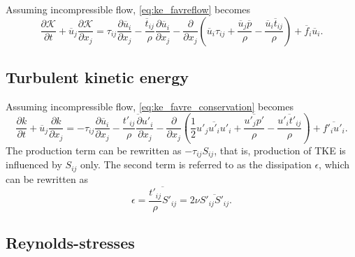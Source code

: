 \documentclass[oneside,a4paper,11pt]{report}
\newcommand{\favg}{\overline{f}}
\newcommand{\pavg}{\overline{p}}
\newcommand{\tavg}{\overline{t}}
\newcommand{\uavg}{\overline{u}}
\newcommand{\ffluc}{f'}
\newcommand{\pfluc}{p'}
\newcommand{\tfluc}{t'}
\newcommand{\ufluc}{u'}
\newcommand{\Sfluc}{S'}
\newcommand{\rs}{\tau}          %
\begin{document}
Assuming incompressible flow, \cref{eq:ke_favreflow} becomes
\begin{equation}
\label{eq:ke_ransflow}
\frac{\partial \mathcal{K} }{\partial t} + \uavg_j \frac{ \partial \mathcal{K} }{\partial x_j} = \rs_{ij} \frac{\partial \uavg_i}{\partial x_j} - \frac{ \tavg_{ij} }{ \rho } \frac{ \partial \uavg_i }{\partial x_j} -  \frac{\partial}{\partial x_j} \left ( \uavg_i \rs_{ij} + \frac{ \uavg_j \pavg }{\rho} - \frac{ \uavg_i \tavg_{ij} }{\rho} \right ) + \favg_i \uavg_i.
\end{equation}

\subsection{Turbulent kinetic energy}
Assuming incompressible flow, \cref{eq:ke_favre_conservation} becomes  
\begin{equation}
\label{eq:tke_ransflow}
\frac{\partial k}{\partial t} + \uavg_j \frac{\partial k}{\partial x_j} = -\rs_{ij} \frac{ \partial \uavg_i }{ \partial x_j} - \overline{ \frac{ \tfluc_{ij} }{\rho} \frac{ \partial \ufluc_i }{ \partial x_j} } - \frac{\partial}{\partial x_j} \left ( \frac{1}{2} \overline{ \ufluc_j \ufluc_i \ufluc_i } + \frac{ \overline{ \ufluc_j \pfluc } }{ \rho } - \frac{ \overline{ \ufluc_i \tfluc_{ij} } }{ \rho } \right ) + \overline{ \ffluc_i \ufluc_i } .
\end{equation}
The production term can be rewritten as $-\rs_{ij} S_{ij}$, that is, production of TKE is influenced by $S_{ij}$ only. The second term is referred to as the dissipation $\epsilon$, which can be rewritten as
\begin{equation}
\epsilon = \overline{ \frac{ \tfluc_{ij} }{ \rho } \Sfluc_{ij} } = 2 \nu \overline{ \Sfluc_{ij} \Sfluc_{ij} }.
\end{equation}

\subsection{Reynolds-stresses}
\end{document}
